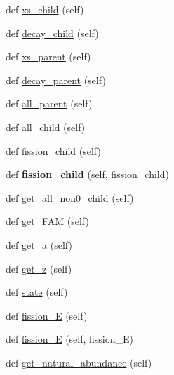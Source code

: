 \begin{DoxyCompactItemize}
\item 
def \hyperlink{classonix_1_1passport_1_1Passport_ac3c56a0ae9cd879601684ce35e95b69d}{xs\+\_\+child} (self)
\item 
def \hyperlink{classonix_1_1passport_1_1Passport_a86050bef8c6adbb3c46b021dd2401e09}{decay\+\_\+child} (self)
\item 
def \hyperlink{classonix_1_1passport_1_1Passport_a89835c749b6828a69d24407460dab23f}{xs\+\_\+parent} (self)
\item 
def \hyperlink{classonix_1_1passport_1_1Passport_a130d29001a8e8d15830b799006d2c745}{decay\+\_\+parent} (self)
\item 
def \hyperlink{classonix_1_1passport_1_1Passport_abd9b45bbdbbfa0e3bc75d7074948d3b1}{all\+\_\+parent} (self)
\item 
def \hyperlink{classonix_1_1passport_1_1Passport_a040bb30a2985be2914b51a07e0ddc249}{all\+\_\+child} (self)
\item 
def \hyperlink{classonix_1_1passport_1_1Passport_aa073caafcac43de54811fd7d18bb0089}{fission\+\_\+child} (self)
\item 
\mbox{\label{classonix_1_1passport_1_1Passport_aac79b49ad59bb5a89b0a022080cdd49f}} 
def {\bfseries fission\+\_\+child} (self, fission\+\_\+child)
\item 
def \hyperlink{classonix_1_1passport_1_1Passport_ae9994c2e5527433c781a08721ab739f7}{get\+\_\+all\+\_\+non0\+\_\+child} (self)
\item 
def \hyperlink{classonix_1_1passport_1_1Passport_a72fa224dd0f81db282c5051f8d1fe180}{get\+\_\+\+F\+AM} (self)
\item 
def \hyperlink{classonix_1_1passport_1_1Passport_a2f70340eb9f6cfaa5f189486c263648a}{get\+\_\+a} (self)
\item 
def \hyperlink{classonix_1_1passport_1_1Passport_a22bf86622c06b66fb337b66227250e1c}{get\+\_\+z} (self)
\item 
def \hyperlink{classonix_1_1passport_1_1Passport_ac94fe908420604d6bbcd9fab7895325b}{state} (self)
\item 
def \hyperlink{classonix_1_1passport_1_1Passport_ac52e38d981da6f201f37e4a747dd37d2}{fission\+\_\+E} (self)
\item 
def \hyperlink{classonix_1_1passport_1_1Passport_aae7f9097507c87f2f098940416d738e7}{fission\+\_\+E} (self, fission\+\_\+E)
\item 
def \hyperlink{classonix_1_1passport_1_1Passport_a02bd09ea9475cf3e6c8d29fe504a92f9}{get\+\_\+natural\+\_\+abundance} (self)

\end{DoxyCompactItemize}

